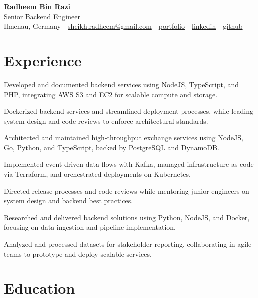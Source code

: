\documentclass[11pt,a4paper]{resume}
\makeatletter
\newcommand{\Portfolio}{https://radheem.github.io/my-cv}
\newcommand{\PortfolioText}{portfolio}
\newcommand{\GitHub}{https://github.com/radheem}
\newcommand{\LinkedIn}{https://www.linkedin.com/in/radheem-razi}
\newcommand{\Email}{sheikh.radheem@gmail.com}
\makeatother
\begin{document}
\begin{center}
  {\huge\bfseries Radheem Bin Razi}\\[3pt]
  {\large Senior Backend Engineer}\\[6pt]
  \small
  Ilmenau, Germany \,\textbar\,
  \href{mailto:\Email}{\Email} \,\textbar\,
  \href{\Portfolio}{\PortfolioText} \,\textbar\,
  \href{\LinkedIn}{linkedin} \,\textbar\,
  \href{\GitHub}{github}
\end{center}
\vspace{2pt}

\section{Experience}

\bullets
  \item Developed and documented backend services using NodeJS, TypeScript, and PHP, integrating AWS S3 and EC2 for scalable compute and storage.
  \item Dockerized backend services and streamlined deployment processes, while leading system design and code reviews to enforce architectural standards.
\bulletsend
\vspace{3pt}
\bullets
  \item Architected and maintained high-throughput exchange services using NodeJS, Go, Python, and TypeScript, backed by PostgreSQL and DynamoDB.
  \item Implemented event-driven data flows with Kafka, managed infrastructure as code via Terraform, and orchestrated deployments on Kubernetes.
  \item Directed release processes and code reviews while mentoring junior engineers on system design and backend best practices.
\bulletsend
\vspace{3pt}
\bullets
  \item Researched and delivered backend solutions using Python, NodeJS, and Docker, focusing on data ingestion and pipeline implementation.
  \item Analyzed and processed datasets for stakeholder reporting, collaborating in agile teams to prototype and deploy scalable services.
\bulletsend
\vspace{3pt}

\section{Education}
\end{document}
